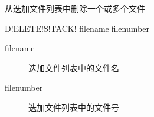\label{sss:deletestack}

从迭加文件列表中删除一个或多个文件

\begin{SACSTX}
D!ELETE!S!TACK! filename|filenumber
\end{SACSTX}

\begin{description}
\item [filename] 迭加文件列表中的文件名
\item [filenumber] 迭加文件列表中的文件号
\end{description}


